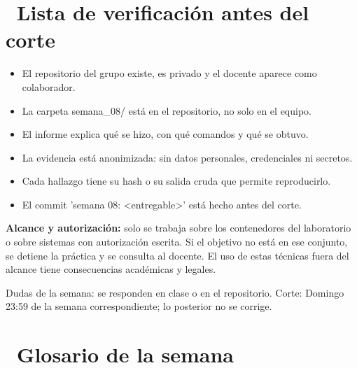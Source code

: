 \documentclass[11pt,a4paper]{article}
\newcommand{\iconotexto}[2]{\textcolor{cyanNeon}{\faIcon{#1}}~#2}
\begin{document}
\section{\iconotexto{clipboard-check}{Lista de verificación antes del corte}}

\begin{itemize}[leftmargin=1.4em,itemsep=2pt,topsep=3pt]
  \item El repositorio del grupo existe, es privado y el docente aparece como colaborador.
  \item La carpeta semana\_08/ está en el repositorio, no solo en el equipo.
  \item El informe explica qué se hizo, con qué comandos y qué se obtuvo.
  \item La evidencia está anonimizada: sin datos personales, credenciales ni secretos.
  \item Cada hallazgo tiene su hash o su salida cruda que permite reproducirlo.
  \item El commit 'semana 08: \textless{}entregable\textgreater{}' está hecho antes del corte.
\end{itemize}

\begin{tcolorbox}[cajaMejora]\textbf{Alcance y autorización:} solo se trabaja sobre los contenedores del laboratorio o sobre sistemas con autorización escrita. Si el objetivo no está en ese conjunto, se detiene la práctica y se consulta al docente. El uso de estas técnicas fuera del alcance tiene consecuencias académicas y legales.
\end{tcolorbox}

\begin{cajaRecuerda}Dudas de la semana: se responden en clase o en el repositorio. Corte: Domingo 23:59 de la semana correspondiente; lo posterior no se corrige.
\end{cajaRecuerda}

\clearpage

\section{\iconotexto{book}{Glosario de la semana}}
\end{document}
